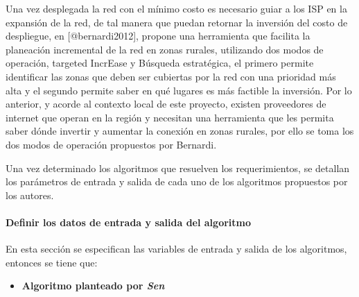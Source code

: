 \documentclass[]{article}
\providecommand{\tightlist}{%
  \setlength{\itemsep}{0pt}\setlength{\parskip}{0pt}}
\let\oldparagraph\paragraph
\renewcommand{\paragraph}[1]{\oldparagraph{#1}\mbox{}}
\begin{document}
Una vez desplegada la red con el mínimo costo es necesario guiar a los
ISP en la expansión de la red, de tal manera que puedan retornar la
inversión del costo de despliegue, en {[}@bernardi2012{]}, propone una
herramienta que facilita la planeación incremental de la red en zonas
rurales, utilizando dos modos de operación, targeted IncrEase y Búsqueda
estratégica, el primero permite identificar las zonas que deben ser
cubiertas por la red con una prioridad más alta y el segundo permite
saber en qué lugares es más factible la inversión. Por lo anterior, y
acorde al contexto local de este proyecto, existen proveedores de
internet que operan en la región y necesitan una herramienta que les
permita saber dónde invertir y aumentar la conexión en zonas rurales,
por ello se toma los dos modos de operación propuestos por Bernardi.

Una vez determinado los algoritmos que resuelven los requerimientos, se
detallan los parámetros de entrada y salida de cada uno de los
algoritmos propuestos por los autores.

\paragraph{Definir los datos de entrada y salida del
algoritmo}\label{definir-los-datos-de-entrada-y-salida-del-algoritmo}

En esta sección se especifican las variables de entrada y salida de los
algoritmos, entonces se tiene que:

\begin{itemize}
\tightlist
\item
  \textbf{Algoritmo planteado por \emph{Sen} }
\end{itemize}
\end{document}
